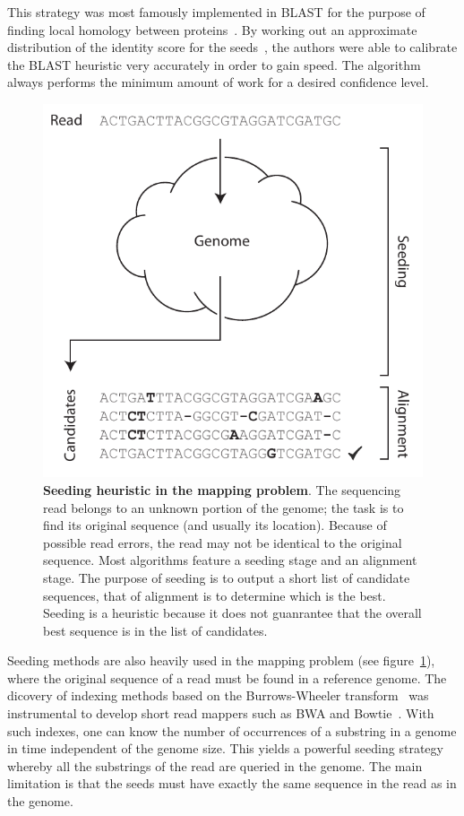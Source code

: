 \documentclass{article}
\begin{document}
This strategy was most famously implemented in BLAST for the purpose of
finding local homology between proteins~\cite{pmid2231712}. By working out
an approximate distribution of the identity score for the
seeds~\cite{pmid8390686, pmid2315319}, the authors were able to calibrate
the BLAST heuristic very accurately in order to gain speed. The algorithm
always performs the minimum amount of work for a desired confidence level.


\begin{figure}[h]
\centering
\includegraphics[scale=.8]{cloud_genome.pdf}
\caption{\textbf{Seeding heuristic in the mapping problem}. The sequencing
read belongs to an unknown portion of the genome; the task is to find its
original sequence (and usually its location). Because of possible read
errors, the read may not be identical to the original sequence. Most
algorithms feature a seeding stage and an alignment stage. The purpose of
seeding is to output a short list of candidate sequences, that of
alignment is to determine which is the best. Seeding is a heuristic
because it does not guanrantee that the overall best sequence is in the
list of candidates.}
\label{fig:cloud_genome}
\end{figure}


Seeding methods are also heavily used in the mapping problem (see
figure~\ref{fig:cloud_genome}), where the original sequence of a read must
be found in a reference genome. The dicovery of indexing methods based on
the Burrows-Wheeler transform~\cite{Ferragina:2000:ODS:795666.796543} was
instrumental to develop short read mappers such as BWA and
Bowtie~\cite{pmid19451168, pmid19261174}. With such indexes, one can know
the number of occurrences of a substring in a genome in time independent
of the genome size. This yields a powerful seeding strategy whereby all
the substrings of the read are queried in the genome. The main limitation
is that the seeds must have exactly the same sequence in the read as in
the genome.
\end{document}
